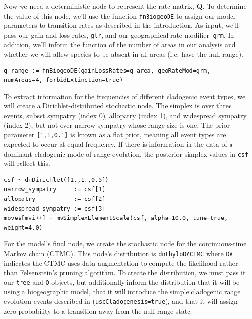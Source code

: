 Now we need a deterministic node to represent the rate matrix, {\bf Q}.
To determine the value of this node, we'll use the function {\tt fnBiogeoDE} to assign our model parameters to transition rates as described in the introduction.
As input, we'll pass our gain and loss rates, {\tt glr}, and our geographical rate modifier, {\tt grm}.
In addition, we'll inform the function of the number of areas in our analysis and whether we will allow species to be absent in all areas (i.e. have the null range).

\begin{snugshade}
\begin{lstlisting}
q_range := fnBiogeoDE(gainLossRates=q_area, geoRateMod=grm, numAreas=4, forbidExtinction=true)
\end{lstlisting}
\end{snugshade}

To extract information for the frequencies of different cladogenic event types, we will create a Dirichlet-distributed stochastic node.
The simplex is over three events, subset sympatry (index 0), allopatry (index 1), and widespread sympatry (index 2), but not over narrow sympatry whose range size is one.
The prior parameter {\tt [1,1,0.1]} is known as a flat prior, meaning all event types are expected to occur at equal frequency.
If there is information in the data of a dominant cladogenic mode of range evolution, the posterior simplex values in {\tt csf} will reflect this.

\begin{snugshade}
\begin{lstlisting}
csf ~ dnDirichlet([1.,1.,0.5])
narrow_sympatry     := csf[1]
allopatry           := csf[2]
widespread_sympatry := csf[3]
moves[mvi++] = mvSimplexElementScale(csf, alpha=10.0, tune=true, weight=4.0)
\end{lstlisting}
\end{snugshade}

For the model's final node, we create the stochastic node for the continuous-time Markov chain (CTMC).
This node's distribution is {\tt dnPhyloDACTMC} where {\tt DA} indicates the CTMC uses data-augmentation to compute the likelihood rather than Felsenstein's pruning algorithm.
To create the distribution, we must pass it our {\tt tree} and {\tt Q} objects, but additionally inform the distribution that it will be using a biogeographic model, that it will introduce the simple cladogenic range evolution events described in \citet{ree08} ({\tt useCladogenesis=true}), and that it will assign zero probability to a transition away from the null range state.

